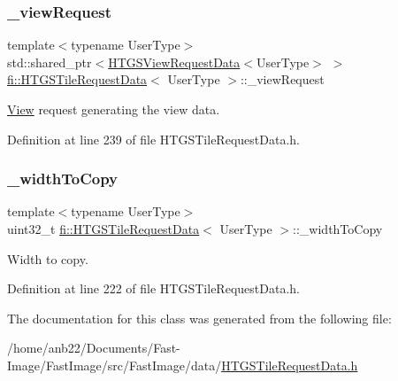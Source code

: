 \subsubsection{\texorpdfstring{\+\_\+view\+Request}{\_viewRequest}}
{\footnotesize\ttfamily template$<$typename User\+Type$>$ \\
std\+::shared\+\_\+ptr$<$\hyperlink{classfi_1_1HTGSViewRequestData}{H\+T\+G\+S\+View\+Request\+Data}$<$User\+Type$>$ $>$ \hyperlink{classfi_1_1HTGSTileRequestData}{fi\+::\+H\+T\+G\+S\+Tile\+Request\+Data}$<$ User\+Type $>$\+::\+\_\+view\+Request\hspace{0.3cm}{\ttfamily [private]}}



\hyperlink{classfi_1_1View}{View} request generating the view data. 



Definition at line 239 of file H\+T\+G\+S\+Tile\+Request\+Data.\+h.

\mbox{\label{classfi_1_1HTGSTileRequestData_a1c0f08c75ace1bd3977a65f2b09e7994}} 
\subsubsection{\texorpdfstring{\+\_\+width\+To\+Copy}{\_widthToCopy}}
{\footnotesize\ttfamily template$<$typename User\+Type$>$ \\
uint32\+\_\+t \hyperlink{classfi_1_1HTGSTileRequestData}{fi\+::\+H\+T\+G\+S\+Tile\+Request\+Data}$<$ User\+Type $>$\+::\+\_\+width\+To\+Copy\hspace{0.3cm}{\ttfamily [private]}}



Width to copy. 



Definition at line 222 of file H\+T\+G\+S\+Tile\+Request\+Data.\+h.



The documentation for this class was generated from the following file\+:\begin{DoxyCompactItemize}
\item 
/home/anb22/\+Documents/\+Fast-\/\+Image/\+Fast\+Image/src/\+Fast\+Image/data/\hyperlink{HTGSTileRequestData_8h}{H\+T\+G\+S\+Tile\+Request\+Data.\+h}\end{DoxyCompactItemize}
